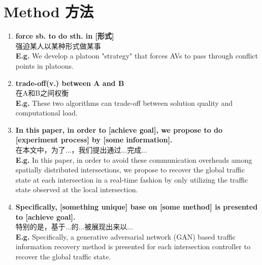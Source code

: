 \chapter{Method 方法}

\begin{enumerate}

    \item \textbf{force sb. to do sth. in [形式]} 
    \\ 强迫某人以某种形式做某事 
    \\ \textbf{E.g.} We develop a platoon "strategy" that forces AVs to pass through conflict points in platoons.
    
    \item \textbf{trade-off(v.) between A and B} 
    \\ 在A和B之间权衡 
    \\ \textbf{E.g.} These two algorithms can trade-off between solution quality and computational load.
    
    \item \textbf{In this paper, in order to [achieve goal], we propose to do [experiment process] by [some information]. } 
    \\ 在本文中，为了...，我们提出通过...完成...
    \\ \textbf{E.g.} In this paper, in order to avoid these communication overheads among spatially distributed intersections, we propose to recover the global traffic state at each intersection in a real-time fashion by only utilizing the traffic state observed at the local intersection.
    
    \item \textbf{Specifically, [something unique] base on [some method] is presented to [achieve goal].} 
    \\ 特别的是，基于...的...被展现出来以...
    \\ \textbf{E.g.} Specifically, a generative adversarial network (GAN) based traffic information recovery method is presented for each intersection controller to recover the global traffic state.
    
    
    
    
\end{enumerate}